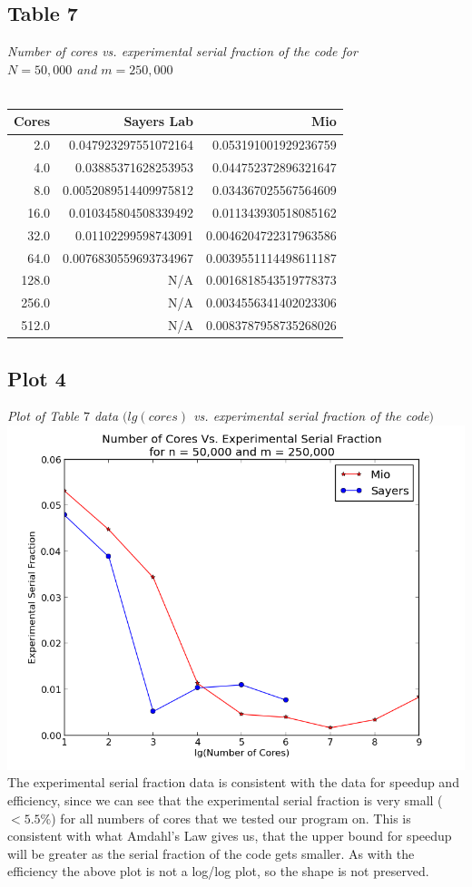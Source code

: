 \documentclass[letterpaper, 12pt]{article}
\begin{document}
	\subsection*{Table 7} \small\textit{Number of cores vs. experimental serial fraction of the code for\\ $N=50,000$ and $m=250,000$} \\\\
	\normalsize
	\begin{tabular}{r||r|r}
	\hline
		Cores              &Sayers Lab                     &Mio \\ 
	\hline
		  2.0    &0.047923297551072164    &0.053191001929236759 \\ 
		  4.0     &0.03885371628253953    &0.044752372896321647 \\ 
		  8.0   &0.0052089514409975812    &0.034367025567564609 \\ 
		 16.0    &0.010345804508339492    &0.011343930518085162 \\ 
		 32.0     &0.01102299598743091   &0.0046204722317963586 \\ 
		 64.0   &0.0076830559693734967   &0.0039551114498611187 \\ 
		128.0                     &N/A   &0.0016818543519778373 \\ 
		256.0                     &N/A   &0.0034556341402023306 \\ 
		512.0                     &N/A   &0.0083787958735268026 \\ 
		\hline
	\end{tabular}
	
	\subsection*{Plot 4} \small\textit{Plot of Table $7$ data $(lg(cores)$ vs. experimental serial fraction of the code$)$} \\
	\normalsize
	\includegraphics[width=.75\linewidth]{ProjectFiles/results/plots/coresVexpserialfrac.png} \\
	The experimental serial fraction data is consistent with the data for speedup and efficiency, since we can see that the experimental serial fraction is very small ($< 5.5\%$) for all numbers of cores that we tested our program on. This is consistent with what Amdahl's Law gives us, that the upper bound for speedup will be greater as the serial fraction of the code gets smaller. As with the efficiency the above plot is not a log/log plot, so the shape is not preserved.
	
\end{document}
